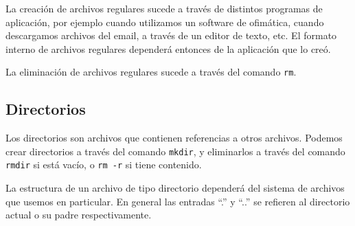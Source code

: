 \documentclass[12pt]{article}
\begin{document}
La creación de archivos regulares sucede a través de distintos programas de 
aplicación, por ejemplo cuando utilizamos un software de ofimática, cuando 
descargamos archivos del email, a través de un editor de texto, etc. El formato 
interno de archivos regulares dependerá entonces de la aplicación que lo creó. 

La eliminación de archivos regulares sucede a través del comando \texttt{rm}. 

\subsection*{Directorios}
Los directorios son archivos que contienen referencias a otros archivos. 
Podemos crear directorios a través del comando \texttt{mkdir}, y eliminarlos
a través del comando \texttt{rmdir} si está vacío, o \texttt{rm -r} si tiene 
contenido. 

La estructura de un archivo de tipo directorio dependerá del sistema de 
archivos que usemos en particular. En general las entradas ``.'' y ``..''
se refieren al directorio actual o su padre respectivamente.  

\end{document}
